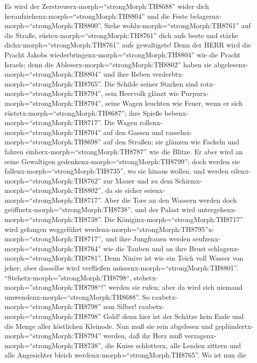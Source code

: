  Es wird der Zerstreuerx-morph=``strongMorph:TH8688'' wider
dich heraufziehenx-morph=``strongMorph:TH8804'' und die Feste
belagernx-morph=``strongMorph:TH8800''. Siehe
wohlx-morph=``strongMorph:TH8761'' auf die Straße,
rüstex-morph=``strongMorph:TH8761'' dich aufs beste und stärke
dichx-morph=``strongMorph:TH8761'' aufs gewaltigste!  Denn
der HERR wird die Pracht Jakobs
wiederbringenx-morph=``strongMorph:TH8804'' wie die Pracht Israels; denn
die Ableserx-morph=``strongMorph:TH8802'' haben sie
abgelesenx-morph=``strongMorph:TH8804'' und ihre Reben
verderbtx-morph=``strongMorph:TH8765''.  Die Schilde seiner
Starken sind rotx-morph=``strongMorph:TH8794'', sein Heervolk glänzt wie
Purpurx-morph=``strongMorph:TH8794'', seine Wagen leuchten wie Feuer,
wenn er sich rüstetx-morph=``strongMorph:TH8687''; ihre Spieße
bebenx-morph=``strongMorph:TH8717''.  Die Wagen
rollenx-morph=``strongMorph:TH8704'' auf den Gassen und
rasselnx-morph=``strongMorph:TH8698'' auf den Straßen; sie glänzen wie
Fackeln und fahren einherx-morph=``strongMorph:TH8787'' wie die Blitze.
 Er aber wird an seine Gewaltigen
gedenkenx-morph=``strongMorph:TH8799''; doch werden sie
fallenx-morph=``strongMorph:TH8735'', wo sie hinaus wollen, und werden
eilenx-morph=``strongMorph:TH8762'' zur Mauer und zu dem
Schirmx-morph=``strongMorph:TH8802'', da sie sicher
seienx-morph=``strongMorph:TH8717''.  Aber die Tore an den
Wassern werden doch geöffnetx-morph=``strongMorph:TH8738'', und der
Palast wird untergehenx-morph=``strongMorph:TH8738''.  Die
Königinx-morph=``strongMorph:TH8717'' wird gefangen weggeführt
werdenx-morph=``strongMorph:TH8795''x-morph=``strongMorph:TH8717'', und
ihre Jungfrauen werden seufzenx-morph=``strongMorph:TH8764'' wie die
Tauben und an ihre Brust schlagenx-morph=``strongMorph:TH8781''.
 Denn Ninive ist wie ein Teich voll Wasser von jeher; aber
dasselbe wird verfließen müssenx-morph=``strongMorph:TH8801''.
``Stehetx-morph=''strongMorph:TH8798``,
stehetx-morph=''strongMorph:TH8798``!'' werden sie rufen; aber da wird
sich niemand umwendenx-morph=``strongMorph:TH8688''.  So
raubetx-morph=``strongMorph:TH8798'' nun Silber!
raubetx-morph=``strongMorph:TH8798'' Gold! denn hier ist der Schätze
kein Ende und die Menge aller köstlichen Kleinode.  Nun muß
sie rein abgelesen und geplündertx-morph=``strongMorph:TH8794'' werden,
daß ihr Herz muß verzagenx-morph=``strongMorph:TH8738'', die Kniee
schlottern, alle Lenden zittern und alle Angesichter bleich
werdenx-morph=``strongMorph:TH8765''.  Wo ist nun die
